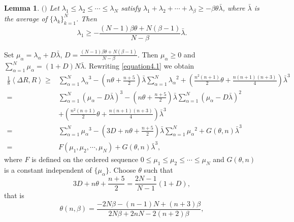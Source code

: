 \documentclass{amsart}
\newtheorem{lemma}[theorem]{Lemma}
\theoremstyle{definition}
\theoremstyle{remark}
\numberwithin{equation}{section}
\begin{document}
\begin{lemma}$(${\cite{fu2025new}}$)$
\label{lemma5.2}
Let ${\lambda _1} \le {\lambda _2} \le  \cdots  \le {\lambda _N}$ satisfy ${\lambda _1} + {\lambda _2} +  \cdots  + {\lambda _\beta} \ge  - \beta\theta \bar \lambda $, where ${\bar \lambda }$ is the average of $\{\lambda _k\}_{k=1}^{N}$. Then
$${\lambda _1} \ge -\frac{{\left( {N - 1} \right)\beta\theta  + N\left( {\beta - 1} \right)}}{{N - \beta}}\bar \lambda. $$
\end{lemma}
Set ${\mu _\alpha } = {\lambda _\alpha } + D\bar \lambda$, $D = \frac{{\left( {N - 1} \right)\beta\theta  + N\left( {\beta - 1} \right)}}{{N - \beta}}$. Then ${\mu _\alpha } \ge 0$ and $\sum\limits_{\alpha  = 1}^N {{\mu _\alpha }}  = \left( {1 + D} \right)N\bar \lambda $. Rewriting \eqref{equation4.1} we obtain
\begin{align*}
\frac{1}{8}\left\langle {\Delta R,R} \right\rangle  \ge & \sum\limits_{\alpha  = 1}^N {{\lambda _\alpha }^3}  - \left( {n\theta  + \frac{{n + 5}}{2}} \right)\bar \lambda \sum\limits_{\alpha  = 1}^N {{\lambda _\alpha }^2}  + \left( {\frac{{{n^2}\left( {n + 1} \right)}}{2}\theta  + \frac{{n\left( {n + 1} \right)\left( {n + 3} \right)}}{4}} \right){{\bar \lambda }^3}\\
 =& \sum\limits_{\alpha  = 1}^N {{{\left( {{\mu _\alpha } - D\bar \lambda } \right)}^3}}  - \left( {n\theta  + \frac{{n + 5}}{2}} \right)\bar \lambda \sum\limits_{\alpha  = 1}^N {{{\left( {{\mu _\alpha } - D\bar \lambda } \right)}^2}} \\
 &+ \left( {\frac{{{n^2}\left( {n + 1} \right)}}{2}\theta  + \frac{{n\left( {n + 1} \right)\left( {n + 3} \right)}}{4}} \right){{\bar \lambda }^3}\\
 =& \sum\limits_{\alpha  = 1}^N {{\mu _\alpha }^3}  - \left( {3D + n\theta  + \frac{{n + 5}}{2}} \right)\bar \lambda \sum\limits_{\alpha  = 1}^N {{\mu _\alpha }^2}  + G\left( {\theta ,n} \right){{\bar \lambda }^3}\\
 =& F\left( {{\mu _1},{\mu _2}, \cdots ,{\mu _N}} \right) + G\left( {\theta ,n} \right){{\bar \lambda }^3},
\end{align*}
where $F$ is  defined on the ordered sequence $0 \le {\mu _1} \le {\mu _2} \le  \cdots  \le {\mu _N}$ and $G\left( {\theta ,n} \right)$ is a constant independent of $\{\mu _\alpha \}$. Choose $\theta$ such that
$$3D + n\theta  + \frac{{n + 5}}{2} = \frac{{2N - 1}}{{N - 1}}\left( {1 + D} \right),$$
that is
$$\theta \left( {n,\beta} \right) = \frac{{ - 2N\beta - \left( {n - 1} \right)N + \left( {n + 3} \right)\beta}}{{2N\beta + 2nN - 2\left( {n + 2} \right)\beta}},$$
\end{document}
